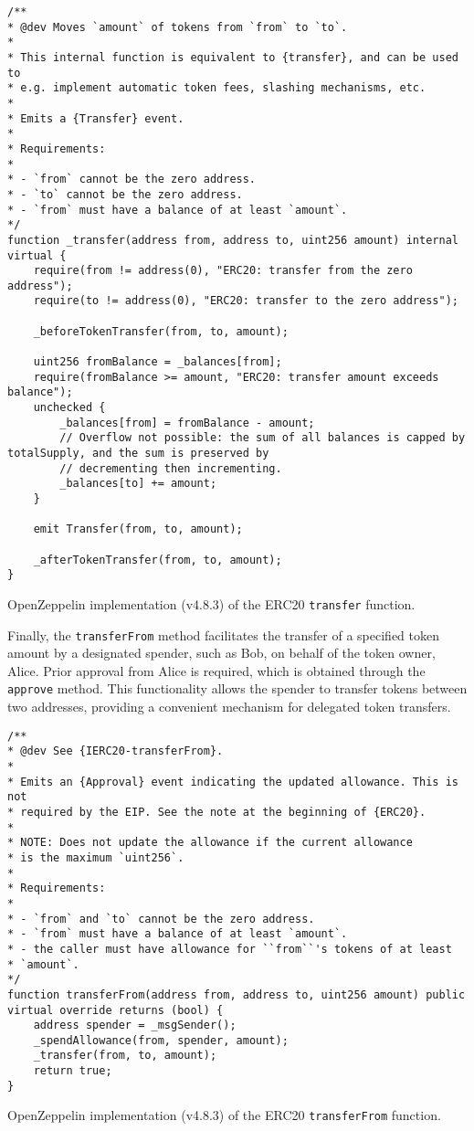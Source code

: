 \begin{listing}[!ht]
    \begin{verbatim}
/**
* @dev Moves `amount` of tokens from `from` to `to`.
*
* This internal function is equivalent to {transfer}, and can be used to
* e.g. implement automatic token fees, slashing mechanisms, etc.
*
* Emits a {Transfer} event.
*
* Requirements:
*
* - `from` cannot be the zero address.
* - `to` cannot be the zero address.
* - `from` must have a balance of at least `amount`.
*/
function _transfer(address from, address to, uint256 amount) internal virtual {
    require(from != address(0), "ERC20: transfer from the zero address");
    require(to != address(0), "ERC20: transfer to the zero address");

    _beforeTokenTransfer(from, to, amount);

    uint256 fromBalance = _balances[from];
    require(fromBalance >= amount, "ERC20: transfer amount exceeds balance");
    unchecked {
        _balances[from] = fromBalance - amount;
        // Overflow not possible: the sum of all balances is capped by totalSupply, and the sum is preserved by
        // decrementing then incrementing.
        _balances[to] += amount;
    }

    emit Transfer(from, to, amount);

    _afterTokenTransfer(from, to, amount);
}
    \end{verbatim}
    \caption{OpenZeppelin implementation (v4.8.3) of the ERC20 \texttt{transfer} function.}
    \label{lst:openzeppelin_transfer}
\end{listing}

Finally, the \texttt{transferFrom} method facilitates the transfer of a specified token amount by a designated spender, such as Bob, on behalf of the token owner, Alice. Prior approval 
from Alice is required, which is obtained through the \texttt{approve} method. This functionality allows the spender to transfer tokens between two addresses, providing a convenient 
mechanism for delegated token transfers.

\begin{listing}[H]
    \begin{verbatim}
/**
* @dev See {IERC20-transferFrom}.
*
* Emits an {Approval} event indicating the updated allowance. This is not
* required by the EIP. See the note at the beginning of {ERC20}.
*
* NOTE: Does not update the allowance if the current allowance
* is the maximum `uint256`.
*
* Requirements:
*
* - `from` and `to` cannot be the zero address.
* - `from` must have a balance of at least `amount`.
* - the caller must have allowance for ``from``'s tokens of at least
* `amount`.
*/
function transferFrom(address from, address to, uint256 amount) public virtual override returns (bool) {
    address spender = _msgSender();
    _spendAllowance(from, spender, amount);
    _transfer(from, to, amount);
    return true;
}
    \end{verbatim}
    \caption{OpenZeppelin implementation (v4.8.3) of the ERC20 \texttt{transferFrom} function.}
    \label{lst:openzeppelin_transferFrom}
\end{listing}

